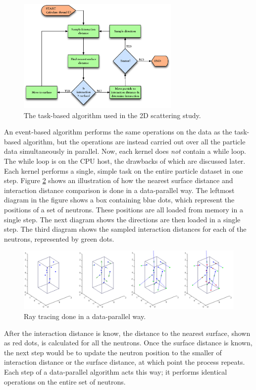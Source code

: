 \begin{figure}[h!] 
  \centering
    \includegraphics[width=0.7\textwidth]{graphics/prelim_alg_task.eps}
     \caption{The task-based algorithm used in the 2D scattering study. \label{prelim_alg_task} }
\end{figure}

An event-based algorithm performs the same operations on the data as the task-based algorithm, but the operations are instead carried out over all the particle data simultaneously in parallel.  Now, each kernel does \emph{not} contain a while loop.  The while loop is on the CPU host, the drawbacks of which are discussed later.  Each kernel performs a single, simple task on the entire particle dataset in one step.  Figure \ref{prelim_batch} shows an illustration of how the nearest surface distance and interaction distance comparison is done in a data-parallel way.  
The leftmost diagram in the figure shows a box containing blue dots, which represent the positions of a set of neutrons.  These positions are all loaded from memory in a single step.  The next diagram shows the directions are then loaded in a single step.  The third diagram shows the sampled interaction distances for each of the neutrons, represented by green dots.  
%
\begin{figure}[h!] 
  \centering
    \includegraphics[width=\textwidth]{graphics/prelim_batch.pdf}
     \caption{Ray tracing done in a data-parallel way. \label{prelim_batch} }
\end{figure}
%
After the interaction distance is know, the distance to the nearest surface, shown as red dots, is calculated for all the neutrons.  Once the surface distance is known, the next step would be to update the neutron position to the smaller of interaction distance or the surface distance, at which point the process repeats.  Each step of a data-parallel algorithm acts this way; it performs identical operations on the entire set of neutrons.

